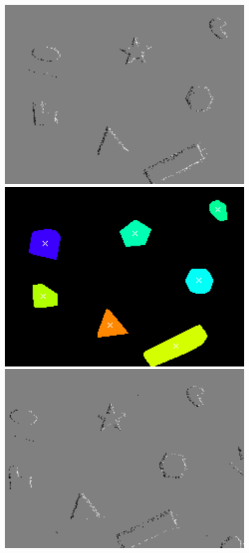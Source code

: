 \begin{figure}
\begin{minipage}{0.33\textwidth}
        \includegraphics[width = 0.95\textwidth]{images/filtered_shapes2.png}
    \end{minipage}
    \begin{minipage}{0.33\textwidth}
        \centering
        \includegraphics[width = 0.95\textwidth]{images/obst_shapes2.png}
    \end{minipage}\hfill
    \begin{minipage}{0.33\textwidth}
        \centering
        \includegraphics[width = 0.95\textwidth]{images/unfiltered_shapes3.png}

\end{minipage}
\end{figure}
